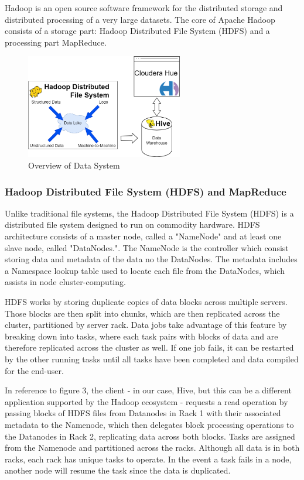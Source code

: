 \documentclass[journal]{IEEEtran}
\begin{document}
Hadoop is an open source software framework for the distributed storage and
 distributed processing of a very large datasets. 
The core of Apache Hadoop consists of a storage part: Hadoop Distributed File System
 (HDFS) and a processing part MapReduce.

\begin{figure}
	\centering
	\includegraphics[width=2.7in]{system_overview_final.png}
	\caption{Overview of Data System}
	\label{system_overview_final}
\end{figure}

\subsubsection{Hadoop Distributed File System (HDFS) and  MapReduce}

Unlike traditional file systems, the Hadoop Distributed File System (HDFS) is a distributed file system designed to run on commodity hardware. 
HDFS architecture consists of a master node, called a "NameNode" and at least one slave node, called "DataNodes."\cite{HDFSarchitecture}.
The NameNode is the controller which consist storing data and metadata of the data no the DataNodes. 
The metadata includes a Namespace lookup table used to locate each file from the DataNodes, which assists in node cluster-computing. 

HDFS works by storing duplicate copies of data blocks across multiple servers. Those blocks are then split into chunks, which are then 
replicated across the cluster, partitioned by server rack. Data jobs take advantage of this feature by breaking down into tasks, 
where each task pairs with blocks of data and are therefore replicated across the cluster as well. If one job fails, it can be restarted 
by the other running tasks until all tasks have been completed and data compiled for the end-user. \cite{HadoopAdmin}

In reference to figure 3, the client - in our case, Hive, but this can be a different application supported by the Hadoop ecosystem - requests a 
read operation by passing blocks of HDFS files from Datanodes in Rack 1 with their associated metadata to the Namenode, which then delegates
block processing operations to the Datanodes in Rack 2, replicating data across both blocks. Tasks are assigned from the Namenode and partitioned
across the racks. Although all data is in both racks, each rack has unique tasks to operate. In the event a task fails in a node, another node will resume
the task since the data is duplicated. \cite{HadoopAdmin}
\end{document}

